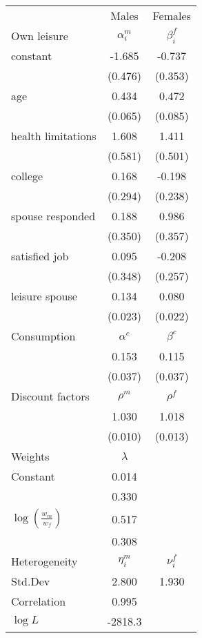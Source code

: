 \begin{tabular}{lcc} 
\hline\hline 
 & Males & Females \\ 
Own leisure & $\alpha_{i}^{m}$ & $\beta_{i}^{f}$ \\ 
constant & -1.685 & -0.737 \\ 
 & (0.476) & (0.353) \\ 
age & 0.434 & 0.472 \\ 
 & (0.065) & (0.085) \\ 
health limitations & 1.608 & 1.411 \\ 
 & (0.581) & (0.501) \\ 
college & 0.168 & -0.198 \\ 
 & (0.294) & (0.238) \\ 
spouse responded & 0.188 & 0.986 \\ 
 & (0.350) & (0.357) \\ 
satisfied job & 0.095 & -0.208 \\ 
 & (0.348) & (0.257) \\ 
leisure spouse & 0.134 & 0.080 \\ 
 & (0.023) & (0.022) \\ 
Consumption & $\alpha^{c}$ & $\beta^{c}$ \\ 
 & 0.153 & 0.115 \\ 
 & (0.037) & (0.037) \\ 
Discount factors & $\rho^m$ & $\rho^f$ \\ 
 & 1.030 & 1.018 \\ 
 & (0.010) & (0.013) \\ 
Weights & $\lambda$ &  \\ 
Constant & 0.014 &  \\ 
 & 0.330 &  \\ 
$\log(\frac{w_m}{w_f})$ & 0.517 &  \\ 
 & 0.308 &  \\ 
Heterogeneity & $\eta_i^m$ & $\nu_i^f$ \\ 
Std.Dev & 2.800 & 1.930 \\ 
Correlation & 0.995 &  \\ 
\hline 
$\log L$ & -2818.3 & \\ 
\hline \hline 
\end{tabular} 
